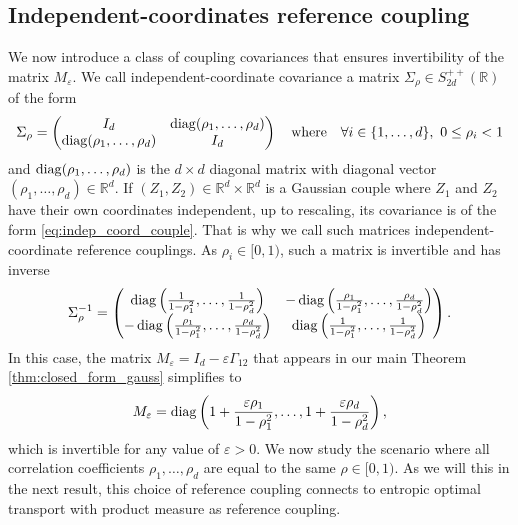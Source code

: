 \documentclass[]{article}
\def\diag{\mathop{\rm diag}\nolimits}
\numberwithin{equation}{section}
\theoremstyle{plain}
\begin{document}
\subsection{Independent-coordinates reference coupling}\label{sec:indep_coord}
We now introduce a class of coupling covariances that ensures invertibility of the matrix $M_{\varepsilon}$. We call independent-coordinate covariance a matrix $\Sigma_{\rho} \in S_{2d}^{++}(\mathbb{R})$  of the form 
\begin{equation}\label{eq:indep_coord_couple}
	\Sigma_{\rho} = \begin{pmatrix}
		I_d & \diag(\rho_1,\ldots, \rho_d) \\
		\diag(\rho_1,\ldots, \rho_d) & I_d
	\end{pmatrix} \quad \text{where} \quad \forall i \in \{1,\ldots,d\},~0 \leq \rho_i< 1
\end{equation}
and $\diag(\rho_1,\ldots, \rho_d)$ is the $d \times d$ diagonal matrix with diagonal vector $(\rho_1,\ldots, \rho_d) \in \mathbb{R}^d$. If $(Z_1, Z_2) \in \mathbb{R}^d \times \mathbb{R}^d$ is a Gaussian couple where $Z_1$ and $Z_2$ have their own coordinates independent, up to rescaling, its covariance is of the form \eqref{eq:indep_coord_couple}. That is why we call such matrices independent-coordinate reference couplings. As $\rho_i \in [0,1)$, such a matrix is invertible and has inverse 
\begin{equation}
	\Sigma_{\rho}^{-1} =  \begin{pmatrix}
		\diag\left(\frac{1}{1-\rho_1^2}, \ldots, \frac{1}{1-\rho_d^2}\right) & -	\diag\left(\frac{\rho_1}{1-\rho_1^2}, \ldots, \frac{\rho_d}{1-\rho_d^2}\right) \\
	-	\diag\left(\frac{\rho_1}{1-\rho_1^2}, \ldots, \frac{\rho_d}{1-\rho_d^2}\right) &	\diag\left(\frac{1}{1-\rho_1^2}, \ldots, \frac{1}{1-\rho_d^2}\right)
	\end{pmatrix}.
\end{equation} 
In this case, the matrix $M_{\varepsilon} = I_d -\varepsilon \Gamma_{12}$ that appears in our main Theorem \ref{thm:closed_form_gauss} simplifies to 
\begin{equation}
	M_\varepsilon = \diag\left(1+\frac{\varepsilon \rho_1}{1-\rho_1^2}, \ldots, 1+\frac{\varepsilon \rho_d}{1-\rho_d^2}\right),
\end{equation}
which is invertible for any value of $\varepsilon > 0$. We now study the scenario where all correlation coefficients $\rho_1,\ldots,\rho_d$ are equal to the same $\rho \in [0,1)$. As we will this in the next result, this choice of reference coupling connects to entropic optimal transport with product measure as reference coupling.
 
\end{document}
